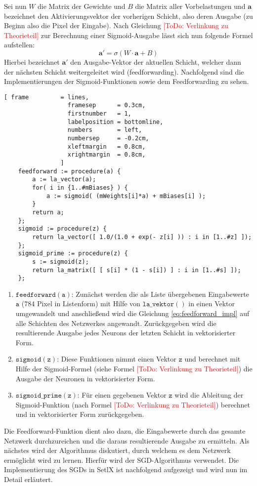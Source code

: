 \noindent
Sei nun $W$ die Matrix der Gewichte und $B$ die Matrix aller Vorbelastungen und $\mathbf{a}$ bezeichnet den Aktivierungsvektor der vorherigen Schicht, also deren Ausgabe (zu Beginn also die Pixel der Eingabe). Nach Gleichung \textcolor{red}{[ToDo: Verlinkung zu Theorieteil]} zur Berechnung einer Sigmoid-Ausgabe lässt sich nun folgende Formel aufstellen: 
\begin{equation}\label{eq:feedforward_impl}
	\mathbf{a}' = \sigma(W\cdot \mathbf{a} + B)
\end{equation}
\noindent
Hierbei bezeichnet $\mathbf{a}'$ den Ausgabe-Vektor der aktuellen Schicht, welcher dann der nächsten Schicht weitergeleitet wird (feedforwarding). Nachfolgend sind die Implementierungen der Sigmoid-Funktionen sowie dem Feedforwarding zu sehen.
\begin{Verbatim}[ frame         = lines, 
                  framesep      = 0.3cm, 
                  firstnumber   = 1,
                  labelposition = bottomline,
                  numbers       = left,
                  numbersep     = -0.2cm,
                  xleftmargin   = 0.8cm,
                  xrightmargin  = 0.8cm,
                ]
    feedforward := procedure(a) {
        a := la_vector(a);	
        for( i in {1..#mBiases} ) { 
            a := sigmoid( (mWeights[i]*a) + mBiases[i] );
        }
        return a;
    };                            
    sigmoid := procedure(z) {
        return la_vector([ 1.0/(1.0 + exp(- z[i] )) : i in [1..#z] ]);
    };
    sigmoid_prime := procedure(z) {
        s := sigmoid(z); 
        return la_matrix([ [ s[i] * (1 - s[i]) ] : i in [1..#s] ]);
    };
\end{Verbatim}
\begin{enumerate}
\item $\mathtt{feedforward(a)}$: Zunächst werden die als Liste übergebenen Eingabewerte $\mathtt{a}$ (784 Pixel in Listenform) mit Hilfe von $\mathtt{la\_vektor()}$ in einen Vektor umgewandelt und anschließend wird die Gleichung \eqref{eq:feedforward_impl} auf alle Schichten des Netzwerkes angewandt. Zurückgegeben wird die resultierende Ausgabe jedes Neurons der letzten Schicht in vektorisierter Form.
\item $\mathtt{sigmoid(z)}$: Diese Funktionen nimmt einen Vektor $\mathtt{z}$ und berechnet mit Hilfe der Sigmoid-Formel (siehe Formel \textcolor{red}{[ToDo: Verlinkung zu Theorieteil]}) die Ausgabe der Neuronen in vektorisierter Form.
\item $\mathtt{sigmoid\_prime(z)}$: Für einen gegebenen Vektor $\mathtt{z}$ wird die Ableitung der Sigmoid-Funktion (nach Formel \textcolor{red}{[ToDo: Verlinkung zu Theorieteil]}) berechnet und in vektorisierter Form zurückgegeben.
\end{enumerate}
\noindent
Die Feedforward-Funktion dient also dazu, die Eingabewerte durch das gesamte Netzwerk durchzureichen und die daraus resultierende Ausgabe zu ermitteln. Als nächstes wird der Algorithmus diskutiert, durch welchem es dem Netzwerk ermöglicht wird zu \glqq lernen\grqq. Hierfür wird der SGD-Algorithmus verwendet. Die Implementierung des SGDs in SetlX ist nachfolgend aufgezeigt und wird nun im Detail erläutert.

